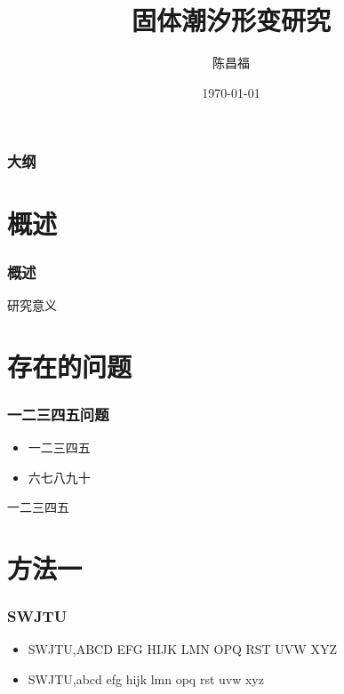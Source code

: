 ﻿\documentclass[12pt]{ctexbeamer}	%
\title{固体潮汐形变研究}	%
\author[陈昌福]{陈昌福}
\institute[西南交通大学]{
大地测量学实验室\\
西南交通大学，测绘遥感信息系
}	%
\date{\today}
\begin{document}
\begin{frame}
\titlepage
\end{frame}


\begin{frame}
\frametitle{大纲}
\tableofcontents
\end{frame}


\section{概述}
\begin{frame}
\frametitle{概述}
研究意义
\end{frame}


\section{存在的问题}

\begin{frame}
\frametitle{一二三四五问题}
\begin{itemize}
\item 一二三四五
\item \alert{六七八九十}
\end{itemize}
\pause
一二三四五

\end{frame}


\section{方法一}

\begin{frame}
\frametitle{SWJTU}

\begin{itemize}
\item<1-> SWJTU,ABCD EFG HIJK LMN OPQ RST UVW XYZ
\item<2-> SWJTU,abcd efg hijk lmn opq rst uvw xyz
\end{itemize}


\end{frame}
\end{document}
